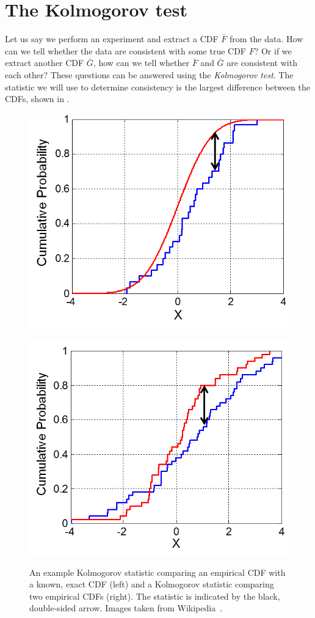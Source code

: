 \section{The Kolmogorov test}\label{sec:kolm}
Let us say we perform an experiment and extract a CDF $\bar{F}$ from 
the data. How can we tell whether the data are consistent with some
true CDF $F$? Or if we extract another CDF $\bar{G}$, how can
we tell whether $\bar{F}$ and $\bar{G}$ are consistent with each other?
These questions can be answered using the {\it Kolmogorov test}.
The statistic we will use to determine consistency is the
largest difference between the CDFs, shown in
.

\begin{figure}
\includegraphics[width=0.45\linewidth]{figs/KS_Example.png}~~~
\includegraphics[width=0.45\linewidth]{figs/KS2_Example.png}
\caption{An example Kolmogorov statistic comparing an empirical CDF
with a known, exact CDF (left)  and a Kolmogorov statistic comparing
two empirical CDFs (right). The statistic is indicated by the black,
double-sided arrow. Images taken from 
Wikipedia~\cite{Wiki_kolm}.}
\label{fig:kolm}
\end{figure}

